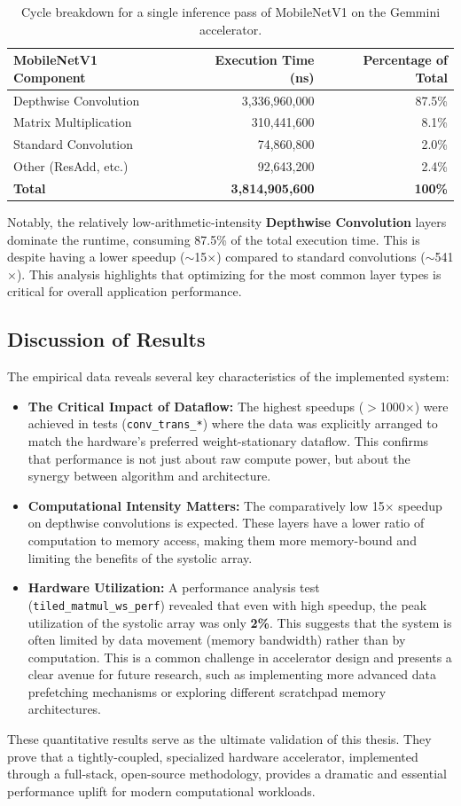 \begin{table}[htbp]
\centering
\caption{Cycle breakdown for a single inference pass of MobileNetV1 on the Gemmini accelerator.}
\label{tab:mobilenet_breakdown}
\begin{tabular}{|l|r|r|}
\hline
\textbf{MobileNetV1 Component} & \textbf{Execution Time (ns)} & \textbf{Percentage of Total} \\
\hline
Depthwise Convolution & 3,336,960,000 & 87.5\% \\
\hline
Matrix Multiplication & 310,441,600 & 8.1\% \\
\hline
Standard Convolution & 74,860,800 & 2.0\% \\
\hline
Other (ResAdd, etc.) & 92,643,200 & 2.4\% \\
\hline
\textbf{Total} & \textbf{3,814,905,600} & \textbf{100\%} \\
\hline
\end{tabular}
\end{table}

Notably, the relatively low-arithmetic-intensity \textbf{Depthwise Convolution} layers dominate the runtime, consuming 87.5\% of the total execution time. This is despite having a lower speedup ($\sim$15$\times$) compared to standard convolutions ($\sim$541$\times$). This analysis highlights that optimizing for the most common layer types is critical for overall application performance.

\subsection{Discussion of Results}

The empirical data reveals several key characteristics of the implemented system:

\begin{itemize}
\item \textbf{The Critical Impact of Dataflow:} The highest speedups ($>$1000$\times$) were achieved in tests (\texttt{conv\_trans\_*}) where the data was explicitly arranged to match the hardware's preferred weight-stationary dataflow. This confirms that performance is not just about raw compute power, but about the synergy between algorithm and architecture.

\item \textbf{Computational Intensity Matters:} The comparatively low 15$\times$ speedup on depthwise convolutions is expected. These layers have a lower ratio of computation to memory access, making them more memory-bound and limiting the benefits of the systolic array.

\item \textbf{Hardware Utilization:} A performance analysis test (\texttt{tiled\_matmul\_ws\_perf}) revealed that even with high speedup, the peak utilization of the systolic array was only \textbf{2\%}. This suggests that the system is often limited by data movement (memory bandwidth) rather than by computation. This is a common challenge in accelerator design and presents a clear avenue for future research, such as implementing more advanced data prefetching mechanisms or exploring different scratchpad memory architectures.
\end{itemize}

These quantitative results serve as the ultimate validation of this thesis. They prove that a tightly-coupled, specialized hardware accelerator, implemented through a full-stack, open-source methodology, provides a dramatic and essential performance uplift for modern computational workloads.
